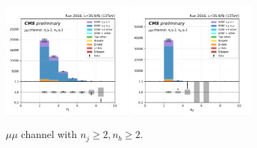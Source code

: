 \begin{figure}[ht]
    \includegraphics[width=0.4\textwidth]{chapters/Analysis/sectionPlots/figures/kinematics_pickles/mumu/2b/mumu_2b_nJets.pdf}
    \includegraphics[width=0.4\textwidth]{chapters/Analysis/sectionPlots/figures/kinematics_pickles/mumu/2b/mumu_2b_nBJets.pdf}
    
    \caption{$\mu\mu$ channel with $n_j\geq2, n_b\geq2$.}
\end{figure}


